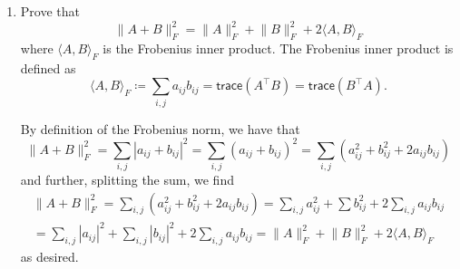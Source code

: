 \documentclass{../../../kin_math}
\begin{document}
\begin{questions}
\begin{enumerate}
    \item Prove that
    \begin{equation}
      \lVert A + B \rVert_F^2 = \lVert A \rVert_F^2 + \lVert B \rVert_F^2 + 2 \langle A, B \rangle_F
    \end{equation}
    where $\langle A, B \rangle_F$ is the Frobenius inner product. The Frobenius inner product is defined as
    \begin{equation}
      \langle A, B \rangle_F \coloneqq \sum_{i, j} a_{ij}b_{ij} = \textsf{trace}(A^\top B) = \textsf{trace}(B^\top A).
    \end{equation}
    \begin{solution}
      By definition of the Frobenius norm, we have that
      \begin{equation*}
        \lVert A + B \rVert_F^2 = \sum_{i, j} |a_{ij} + b_{ij}|^2 = \sum_{i, j} (a_{ij} + b_{ij})^2 = \sum_{i, j} (a_{ij}^2 + b_{ij}^2 + 2a_{ij}b_{ij})
      \end{equation*}
      and further, splitting the sum, we find
      \begin{multline*}
        \lVert A + B \rVert_F^2 = \sum_{i, j} (a_{ij}^2 + b_{ij}^2 + 2a_{ij}b_{ij}) = \sum_{i, j} a_{ij}^2 + \sum b_{ij}^2 + 2 \sum_{i, j} a_{ij} b_{ij} \\
        = \sum_{i, j} |a_{ij}|^2 + \sum_{i, j} |b_{ij}|^2 + 2 \sum_{i, j} a_{ij} b_{ij} = \lVert A \rVert_F^2 + \lVert B \rVert_F^2 + 2 \langle A, B \rangle_F
      \end{multline*}
      as desired.
    \end{solution}
  \end{enumerate}


\end{questions}
\end{document}
